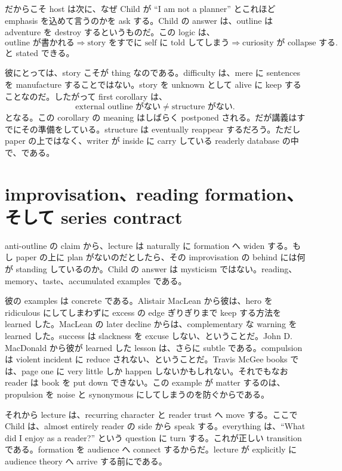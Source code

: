 だからこそ host は次に、なぜ Child が ``I am not a planner'' とこれほど emphasis を込めて言うのかを ask する。Child の answer は、outline は adventure を destroy するというものだ。この logic は、
\begin{equation}
\text{outline が書かれる} \Longrightarrow \text{story をすでに self に told してしまう} \Longrightarrow \text{curiosity が collapse する}.
\end{equation}
と stated できる。

彼にとっては、story こそが thing なのである。difficulty は、mere に sentences を manufacture することではない。story を unknown として alive に keep することなのだ。したがって first corollary は、
\begin{equation}
\text{external outline がない} \neq \text{structure がない}.
\end{equation}
となる。この corollary の meaning はしばらく postponed される。だが講義はすでにその準備をしている。structure は eventually reappear するだろう。ただし paper の上ではなく、writer が inside に carry している readerly database の中で、である。

\section{improvisation、reading formation、そして series contract}

anti-outline の claim から、lecture は naturally に formation へ widen する。もし paper の上に plan がないのだとしたら、その improvisation の behind には何が standing しているのか。Child の answer は mysticism ではない。reading、memory、taste、accumulated examples である。

彼の examples は concrete である。Alistair MacLean から彼は、hero を ridiculous にしてしまわずに excess の edge ぎりぎりまで keep する方法を learned した。MacLean の later decline からは、complementary な warning を learned した。success は slackness を excuse しない、ということだ。John D. MacDonald から彼が learned した lesson は、さらに subtle である。compulsion は violent incident に reduce されない、ということだ。Travis McGee books では、page one に very little しか happen しないかもしれない。それでもなお reader は book を put down できない。この example が matter するのは、propulsion を noise と synonymous にしてしまうのを防ぐからである。

それから lecture は、recurring character と reader trust へ move する。ここで Child は、almost entirely reader の side から speak する。everything は、``What did I enjoy as a reader?'' という question に turn する。これが正しい transition である。formation を audience へ connect するからだ。lecture が explicitly に audience theory へ arrive する前にである。

